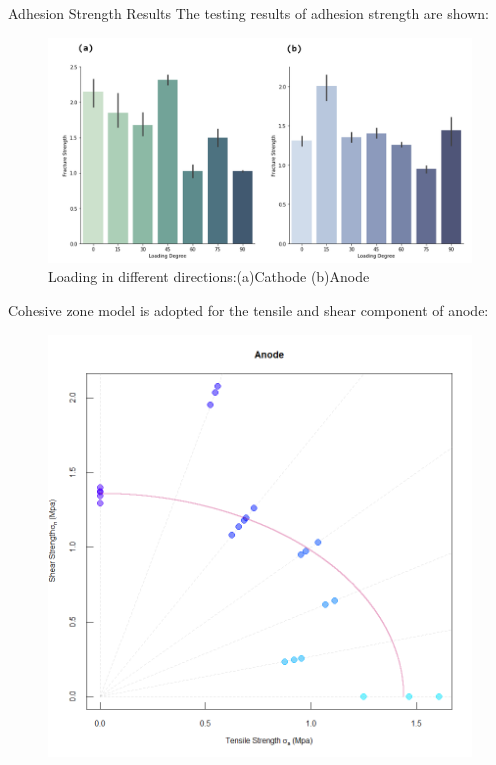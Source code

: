 \documentclass[final]{beamer}
\newlength{\onecolwid}
\newlength{\twocolwid}
\begin{document}
\begin{frame}[t]
\begin{columns}[t]
\begin{column}{\twocolwid}
\begin{columns}[t,totalwidth=\twocolwid]
\begin{column}{\onecolwid}
\begin{block}{Adhesion Strength Results}
The testing results of adhesion strength are shown:
\begin{figure}
\includegraphics[width=\linewidth]{Strength.png}
\caption{Loading in different directions:(a)Cathode (b)Anode}
\end{figure}
Cohesive zone model is adopted for the tensile and shear component of anode:
\begin{figure}
\includegraphics[width=0.8\linewidth]{circle.png}
\end{figure}


\end{block}


\end{column} %


\end{columns}
\end{column}
\end{columns}
\end{frame}
\end{document}
